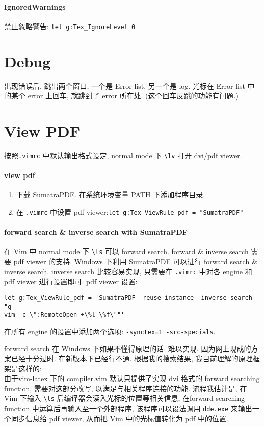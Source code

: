 \documentclass{article}
\begin{document}
\subsection*{IgnoredWarnings}
禁止忽略警告: \verb`let g:Tex_IgnoreLevel 0`
\part{Debug}
出现错误后, 跳出两个窗口, 一个是 Error list, 另一个是 log. 光标在 Error list 中的某个 error 上回车, 就跳到了 error 所在处. (这个回车反跳的功能有问题.)
\part{View PDF}
按照\verb`.vimrc` 中默认输出格式设定, normal mode 下 \verb`\lv` 打开 dvi/pdf viewer.
\subsection*{view pdf}
\begin{enumerate}
\item 下载 SumatraPDF. 在系统环境变量 PATH 下添加程序目录.
\item 在 \verb`.vimrc` 中设置 pdf viewer:\verb`let g:Tex_ViewRule_pdf = "SumatraPDF"`
\end{enumerate}
\subsection*{forward search \& inverse search with SumatraPDF}
在 Vim 中 normal mode 下 \verb`\ls` 可以 forward search. forward \& inverse search 需要 pdf viewer 的支持.
Windows 下利用 SumatraPDF 可以进行 forward search \& inverse search. 
inverse search 比较容易实现, 只需要在 \verb`.vimrc` 中对各 engine 和 pdf viewer 进行设置即可.
pdf viewer 设置:
\begin{verbatim}
let g:Tex_ViewRule_pdf = 'SumatraPDF -reuse-instance -inverse-search "g
vim -c \":RemoteOpen +\%l \%f\""'
\end{verbatim}

在所有 engine 的设置中添加两个选项: \verb`-synctex=1 -src-specials`.

forward search 在 Windows 下如果不懂得原理的话, 难以实现. 因为网上现成的方案已经十分过时. 在新版本下已经行不通. 根据我的搜索结果, 我目前理解的原理框架是这样的:\hfill\\
由于vim-latex 下的 compiler.vim 默认只提供了实现 dvi 格式的 forward searching function, 需要对这部分改写, 以满足与相关程序连接的功能. 流程我估计是, 在 Vim 下输入 \verb`\ls` 后编译器会读入光标的位置等相关信息, 
在forward searching function 中运算后再输入至一个外部程序, 该程序可以设法调用 \verb`dde.exe` 来输出一个同步信息给 pdf viewer, 从而把 Vim 中的光标值转化为 pdf 中的位置.
\end{document}
